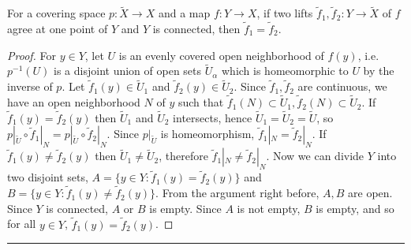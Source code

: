 \begin{prop} For a covering space $p:\tilde{X}\rightarrow X$ and a map $f:Y\rightarrow X$, if two lifts $\tilde{f}_1,\tilde{f}_2:Y\rightarrow \tilde{X}$ of $f$ agree at one point of $Y$ and $Y$ is connected, then $\tilde{f}_1=\tilde{f}_2$.
\end{prop}
\begin{proof}
For $y\in Y$, let $U$ is an evenly covered open neighborhood of $f(y)$, i.e. $p^{-1}(U)$ is a disjoint union of open sets $\tilde{U}_\alpha$ which is homeomorphic to $U$ by the inverse of $p$. Let $\tilde{f}_1(y)\in \tilde{U}_1$ and $\tilde{f}_2(y)\in\tilde{U}_2$. Since $\tilde{f}_1, \tilde{f}_2$ are continuous, we have an open neighborhood $N$ of $y$ such that $\tilde{f}_1(N)\subset \tilde{U}_1,\tilde{f}_2(N)\subset \tilde{U}_2$. If $\tilde{f}_1(y)=\tilde{f}_2(y)$ then $\tilde{U}_1$ and $\tilde{U}_2$ intersects, hence $\tilde{U}_1=\tilde{U}_2=\tilde{U}$, so $p|_{\tilde{U}}\circ \tilde{f}_1|_N=p|_{\tilde{U}}\circ \tilde{f}_2|_N$. Since $p|_{\tilde{U}}$ is homeomorphism, $\tilde{f}_1|_N=\tilde{f}_2|_N$. If $\tilde{f}_1(y)\neq \tilde{f}_2(y)$ then $\tilde{U}_1\neq \tilde{U}_2$, therefore $\tilde{f}_1|_N\neq \tilde{f}_2|_N$. Now we can divide $Y$ into two disjoint sets, $A=\{y\in Y:\tilde{f}_1(y)=\tilde{f}_2(y)\}$ and $B=\{y\in Y:\tilde{f}_1(y)\neq \tilde{f}_2(y)\}$. From the argument right before, $A,B$ are open. Since $Y$ is connected, $A$ or $B$ is empty. Since $A$ is not empty, $B$ is empty, and so for all $y\in Y$, $\tilde{f}_1(y)=\tilde{f}_2(y)$.
\end{proof}
\noindent\rule{\textwidth}{1pt}
\newline